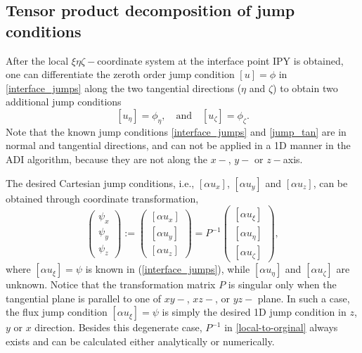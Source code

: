 \documentclass[dissertation]{uathesis}
\begin{document}
\begin{body}
\subsection{Tensor product decomposition of jump conditions}
After the local $\xi \eta \zeta -$coordinate system at the interface point IPY is obtained, one can differentiate the zeroth order jump condition $[u]=\phi$ in \eqref{interface_jumps} along the two tangential directions ($\eta$ and $\zeta$) to obtain two additional jump conditions 
\begin{equation}\label{jump_tan}
[u_{\eta}] = \phi_{\eta}, \quad \mbox{and} \quad [u_{\zeta}] = \phi_{\zeta}.
\end{equation}
Note that the known jump conditions \eqref{interface_jumps} and \eqref{jump_tan} 
are in normal and tangential directions, and can not be applied in a 1D manner
in the ADI algorithm, because they are not along the $x-$, $y-$ or $z-$axis. 

The desired Cartesian jump conditions, i.e., $[\alpha u_{x}]$, $[\alpha u_{y}]$ and $[\alpha u_{z}]$, can be obtained through coordinate transformation, 
%
\begin{equation} \label{local-to-orginal}
\begin{pmatrix}
\psi_{x}    \\
\psi_{y}    \\
\psi_{z}
\end{pmatrix}
:=
\begin{pmatrix}
[\alpha u_{x}]   \\
[\alpha u_{y}]   \\
[\alpha u_{z}]
\end{pmatrix}
=
P^{-1}
\begin{pmatrix}
[\alpha u_{\xi}]    \\
[\alpha u_{\eta}]   \\
[\alpha u_{\zeta}]
\end{pmatrix},
\end{equation}
%
where $[\alpha u_{\xi}] = \psi$ is known in (\ref{interface_jumps}), while  $[\alpha u_{\eta}]$ and $[\alpha u_{\zeta}]$ are unknown. 
Notice that the transformation matrix $P$ is singular only when the tangential plane is parallel to one of $xy-$, $xz-$, or $yz-$ plane. In such a case, the flux jump condition $[\alpha u_{\xi}] = \psi$ is simply the desired 1D jump condition in $z$, $y$ or $x$ direction. Besides this degenerate case, $P^{-1}$ in \eqref{local-to-orginal} always exists and can be calculated either analytically or numerically.


\end{body}
\end{document}
